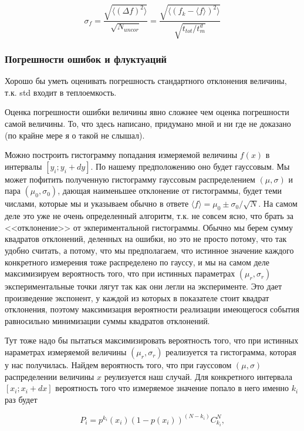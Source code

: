 \documentclass[a4paper,12pt]{article} %
\begin{document}
\begin{equation}
\sigma_f = \dfrac{\sqrt{\langle (\Delta f) ^2 \rangle}}{\sqrt{N_{uncor}}} = \dfrac{\sqrt{\langle (f_k - \langle f \rangle)^2 \rangle}}{\sqrt{t_{tot} / t^d_m}}
\end{equation}

\subsubsection{Погрешности ошибок и флуктуаций}

Хорошо бы уметь оценивать погрешность стандартного отклонения величины, т.к. std входит в теплоемкость.

Оценка погрешности ошибки величины явно сложнее чем оценка погрешности самой величины. То, что здесь написано, придумано мной и ни где не доказано (по крайне мере я о такой не слышал). 

Можно построить гистограмму попадания измеряемой величины $f(x)$ в интервалы $[y_i; y_i + dy]$. По нашему предположению оно будет гауссовым. Мы может пофитить полученную гистограмму гауссовым распределением $(\mu, \sigma)$ и пара $(\mu_0, \sigma_0)$, дающая наименьшее отклонение от гистограммы, будет теми числами, которые мы и указываем обычно в ответе $\langle f \rangle = \mu_0 \pm \sigma_0 / \sqrt{N}$. На самом деле это уже не очень определенный алгоритм, т.к. не совсем ясно, что брать за <<отклонение>> от экпериментальной гистограммы. Обычно мы берем сумму квадратов отклонений, деленных на ошибки, но это не просто потому, что так удобно считать, а потому, что мы предполагаем, что истинное значение каждого конкретного измерения тоже распределено по гауссу, и мы на самом деле максимизируем вероятность того, что при истинных параметрах $(\mu_r, \sigma_r)$ экспериментальные точки лягут так как они легли на эксперименте. Это дает произведение экспонент, у каждой из которых в показателе стоит квадрат отклонения, поэтому максимизация вероятности реализации имеющегося события равносильно минимизации суммы квадратов отклонений. 

Тут тоже надо бы пытаться максимизировать вероятность того, что при истинных нараметрах измеряемой величины $(\mu_r, \sigma_r)$ реализуется та гистограмма, которая у нас получилась. Найдем вероятность того, что при гауссовом $(\mu, \sigma)$ распределении величины $x$ реулизуется наш случай. Для конкретного интервала $[x_i; x_i + dx]$ вероятность того что измеряемое значение попало в него именно $k_i$ раз будет

\begin{equation}
P_i = p^{k_i}(x_i)(1 - p(x_i))^{(N-{k_i})} C^{N}_{k_i},
\end{equation}
\end{document}
